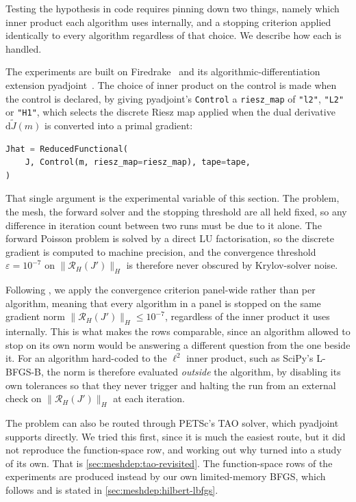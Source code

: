 \documentclass[a4paper,11pt]{article}
\newcommand{\Rmap}{\mathcal{R}}              %
\newcommand{\Jt}{\tilde{J}}                  %
\theoremstyle{spacedplain} \newtheorem{theorem}[counter]{Theorem} \newtheorem{lemma}[counter]{Lemma} \newtheorem{prop}[counter]{Proposition} \newtheorem{cor}[counter]{Corollary}
\theoremstyle{spaceddefinition} \newtheorem{defn}[counter]{Definition} \newtheorem{example}[counter]{Example} \newtheorem{remark}[counter]{Remark}
\begin{document}
Testing the hypothesis in code requires pinning down two things, namely which inner product each algorithm uses internally, and a stopping criterion applied identically to every algorithm regardless of that choice. We describe how each is handled.

The experiments are built on Firedrake~\citep{firedrake2016} and its algorithmic-differentiation extension pyadjoint~\citep{mitusch2019}. The choice of inner product on the control is made when the control is declared, by giving pyadjoint's \texttt{Control} a \texttt{riesz\_map} of \texttt{"l2"}, \texttt{"L2"} or \texttt{"H1"}, which selects the discrete Riesz map applied when the dual derivative $\mathrm{d}\Jt(m)$ is converted into a primal gradient:
\begin{lstlisting}[language=Python]
Jhat = ReducedFunctional(
    J, Control(m, riesz_map=riesz_map), tape=tape,
)
\end{lstlisting}
That single argument is the experimental variable of this section. The problem, the mesh, the forward solver and the stopping threshold are all held fixed, so any difference in iteration count between two runs must be due to it alone. The forward Poisson problem is solved by a direct LU factorisation, so the discrete gradient is computed to machine precision, and the convergence threshold $\varepsilon = 10^{-7}$ on $\|\Rmap_H(J')\|_H$ is therefore never obscured by Krylov-solver noise.

Following \citet[pp.~67--68]{shfp2017}, we apply the convergence criterion panel-wide rather than per algorithm, meaning that every algorithm in a panel is stopped on the same gradient norm $\|\Rmap_H(J')\|_H \le 10^{-7}$, regardless of the inner product it uses internally. This is what makes the rows comparable, since an algorithm allowed to stop on its own norm would be answering a different question from the one beside it. For an algorithm hard-coded to the $\ell^{2}$ inner product, such as SciPy's L-BFGS-B, the norm is therefore evaluated \emph{outside} the algorithm, by disabling its own tolerances so that they never trigger and halting the run from an external check on $\|\Rmap_H(J')\|_H$ at each iteration.

The problem can also be routed through PETSc's TAO solver, which pyadjoint supports directly. We tried this first, since it is much the easiest route, but it did not reproduce the function-space row, and working out why turned into a study of its own. That is \cref{sec:meshdep:tao-revisited}. The function-space rows of the experiments are produced instead by our own limited-memory BFGS, which follows \citet[Sect.~1.5.4.1]{shfp2017} and is stated in \cref{sec:meshdep:hilbert-lbfgs}.
\end{document}
